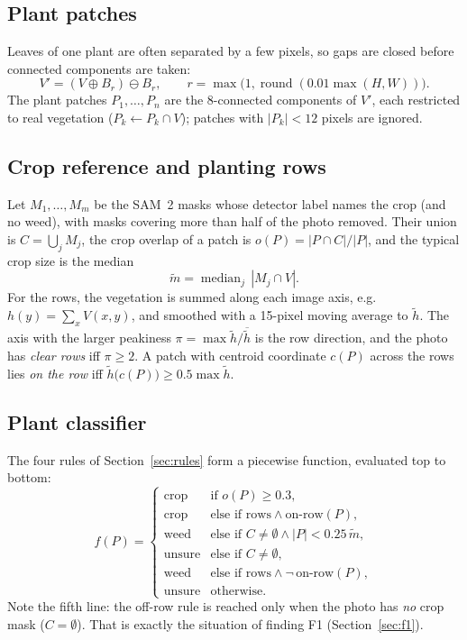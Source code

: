 \subsection{Plant patches}
Leaves of one plant are often separated by a few pixels, so gaps are closed before connected
components are taken:
\begin{equation}
  V' = (V \oplus B_r)\ominus B_r,\qquad r=\max\bigl(1,\operatorname{round}(0.01\max(H,W))\bigr).
\end{equation}
The plant patches $P_1,\dots,P_n$ are the 8-connected components of $V'$, each restricted to real
vegetation ($P_k\leftarrow P_k\cap V$); patches with $|P_k|<12$ pixels are ignored.

\subsection{Crop reference and planting rows}
Let $M_1,\dots,M_m$ be the SAM~2 masks whose detector label names the crop (and no weed), with masks
covering more than half of the photo removed. Their union is $C=\bigcup_j M_j$, the crop overlap of a
patch is $o(P)=|P\cap C|/|P|$, and the typical crop size is the median
\begin{equation}
  \tilde m = \operatorname{median}_j\, |M_j\cap V| .
\end{equation}
For the rows, the vegetation is summed along each image axis, e.g.\ $h(y)=\sum_x V(x,y)$, and smoothed
with a 15-pixel moving average to $\tilde h$. The axis with the larger peakiness
$\pi=\max\tilde h/\overline{\tilde h}$ is the row direction, and the photo has \emph{clear rows} iff
$\pi\ge 2$. A patch with centroid coordinate $c(P)$ across the rows lies \emph{on the row} iff
$\tilde h\bigl(c(P)\bigr)\ge 0.5\max\tilde h$.

\subsection{Plant classifier}
The four rules of Section~\ref{sec:rules} form a piecewise function, evaluated top to bottom:
\begin{equation}\label{eq:rules}
f(P)=\begin{cases}
\text{crop}   & \text{if } o(P)\ge 0.3,\\
\text{crop}   & \text{else if rows} \wedge \text{on-row}(P),\\
\text{weed}   & \text{else if } C\neq\emptyset \wedge |P| < 0.25\,\tilde m,\\
\text{unsure} & \text{else if } C\neq\emptyset,\\
\text{weed}   & \text{else if rows} \wedge \neg\,\text{on-row}(P),\\
\text{unsure} & \text{otherwise.}
\end{cases}
\end{equation}
Note the fifth line: the off-row rule is reached only when the photo has \emph{no} crop mask
($C=\emptyset$). That is exactly the situation of finding F1 (Section~\ref{sec:f1}).

